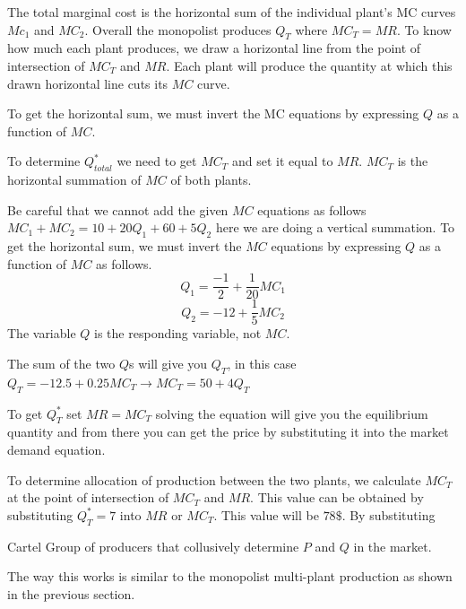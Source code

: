 \documentclass[../ECON-281-Notes.tex]{subfiles}
\begin{document}
The total marginal cost is the horizontal sum of the individual plant's MC curves $Mc_1$ and $MC_2$.
Overall the monopolist produces $Q_T$ where $MC_T = MR$. 
To know how much each plant produces, we draw a horizontal line from the point of intersection of $MC_T$ and $MR$. Each plant will produce the quantity at which this drawn horizontal line cuts its $MC$ curve.

To get the horizontal sum, we must invert the MC equations by expressing $Q$ as a function of $MC$.

To determine $Q_{total}^{*}$ we need to get $MC_T$ and set it equal to $MR$. 
$MC_T$ is the horizontal summation of $MC$ of both plants.

\begin{Note}
  Be careful that we cannot add the given $MC$ equations as follows $MC_1+MC_2= 10 + 20Q_1 + 60 + 5Q_2$ here we are doing a vertical summation. To get the horizontal sum, we must invert the $MC$ equations by expressing $Q$ as a function of $MC$ as follows. 
\[ 
Q_1 = \frac{-1}{2} + \frac{1}{20} MC_1
\] 
\[ 
Q_2 = -12 + \frac{1}{5} MC_2 
\] 
The variable $Q$ is the responding variable, not $MC$.
\end{Note}

The sum of the two $Q$s will give you $Q_T$, in this case $Q_T = -12.5 + 0.25 MC_T \to MC_T = 50 + 4 Q_T$ 

To get $Q_T^*$ set $MR = MC_T$ solving the equation will give you the equilibrium quantity and from there you can get the price by substituting it into the market demand equation.

To determine allocation of production between the two plants, we calculate $MC_T$ at the point of intersection of $MC_T$ and $MR$. This value can be obtained by substituting $Q_T^* = 7$ into $MR$ or $MC_T$. This value will be $78\$ $.
By substituting  
\begin{Definition}
  {Cartel} 
  Group of producers that collusively determine $P$ and $Q$ in the market.

  The way this works is similar to the monopolist multi-plant production as shown in the previous section.
\end{Definition}
\end{document}
